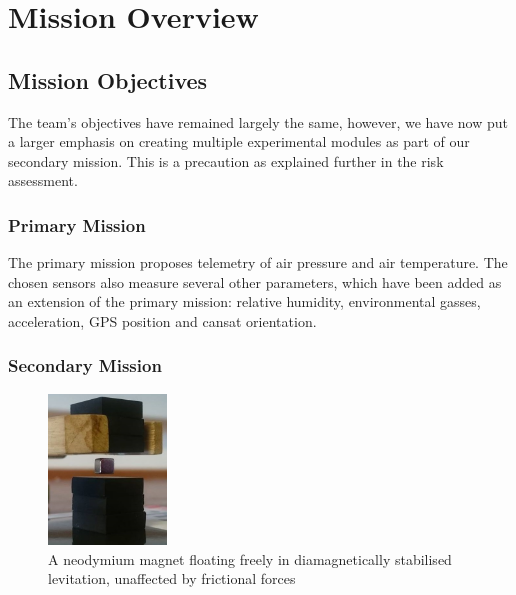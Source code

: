 \documentclass{report}
\begin{document}
	
	\section{Mission Overview}
		\subsection{Mission Objectives}
		The team's objectives have remained largely the same, however, we have
		now put a larger emphasis on creating multiple experimental modules as part
		of our secondary mission. This is a precaution as explained further in the
		risk assessment.

		\subsubsection{Primary Mission}
		The primary mission proposes telemetry of air pressure and
		air temperature. The chosen sensors also measure 
		several other parameters, 
		which have been added as an extension of the primary mission: relative
		humidity, environmental gasses, acceleration, GPS position and cansat
		orientation.

		\subsubsection{Secondary Mission}

		\begin{figure}
			\vspace{-32.5pt}
	 		\begin{center}
			\includegraphics[width=0.28\textwidth]{floatingMagnet}
			\end{center}
			\vspace{-15pt}
			\caption{A neodymium magnet floating freely in diamagnetically
			stabilised levitation, unaffected by frictional forces}
		\end{figure}
\end{document}
